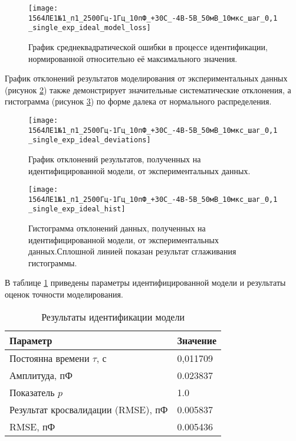 	\begin{figure}[!htp]
		\centering
		\texttt{[image: 1564ЛЕ1№1\_п1\_2500Гц-1Гц\_10пФ\_+30С\_-4В-5В\_50мВ\_10мкс\_шаг\_0,1\_single\_exp\_ideal\_model\_loss]}
		\caption{График среднеквадратической ошибки в процессе идентификации,
		         нормированной относительно её максимального значения.}
		\label{pic:loss_single_exp_ideal_303}
	\end{figure}

	График отклонений результатов моделирования от экспериментальных данных
	(рисунок \ref{pic:deviations_single_exp_ideal_303}) также демонстрирует
	значительные систематические отклонения, а гистограмма (рисунок 
	\ref{pic:hist_single_exp_ideal_303}) по форме далека от нормального 
	распределения.

	\begin{figure}[!htp]
		\centering
		\texttt{[image: 1564ЛЕ1№1\_п1\_2500Гц-1Гц\_10пФ\_+30С\_-4В-5В\_50мВ\_10мкс\_шаг\_0,1\_single\_exp\_ideal\_deviations]}
		\caption{График отклонений результатов, полученных на идентифицированной
		модели, от экспериментальных данных.}
		\label{pic:deviations_single_exp_ideal_303}
	\end{figure}

	\begin{figure}[!htp]
		\centering
		\texttt{[image: 1564ЛЕ1№1\_п1\_2500Гц-1Гц\_10пФ\_+30С\_-4В-5В\_50мВ\_10мкс\_шаг\_0,1\_single\_exp\_ideal\_hist]}
		\caption{Гистограмма отклонений данных, полученных на идентифицированной 
		         модели, от экспериментальных данных.Сплошной линией показан
		         результат сглаживания гистограммы.}
		\label{pic:hist_single_exp_ideal_303}
	\end{figure}

	В таблице \ref{table:results_single_exp_ideal_303} приведены параметры 
	идентифицированной модели и результаты оценок точности моделирования.

	\begin{table}[!htp]
		\centering
		\caption{Результаты идентификации модели}
		\begin{tabular}{|l|l|}
			\hline
			Параметр                           & Значение \\ \hline
			Постоянна времени $\tau$, с        & 0,011709 \\ \hline
			Амплитуда, пФ                      & 0.023837 \\ \hline
			Показатель $p$                     & 1.0      \\ \hline
			Результат кросвалидации (RMSE), пФ & 0.005837 \\ \hline
			RMSE, пФ                           & 0.005436 \\ \hline
		\end{tabular}
		\label{table:results_single_exp_ideal_303}
	\end{table}

